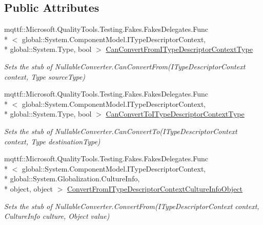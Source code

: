 \subsection*{Public Attributes}
\begin{DoxyCompactItemize}
\item 
mqttf\-::\-Microsoft.\-Quality\-Tools.\-Testing.\-Fakes.\-Fakes\-Delegates.\-Func\\*
$<$ global\-::\-System.\-Component\-Model.\-I\-Type\-Descriptor\-Context, \\*
global\-::\-System.\-Type, bool $>$ \hyperlink{class_system_1_1_component_model_1_1_fakes_1_1_stub_nullable_converter_ad3327aa95277d325a1bc1b96826f2998}{Can\-Convert\-From\-I\-Type\-Descriptor\-Context\-Type}
\begin{DoxyCompactList}\small\item\em Sets the stub of Nullable\-Converter.\-Can\-Convert\-From(\-I\-Type\-Descriptor\-Context context, Type source\-Type)\end{DoxyCompactList}\item 
mqttf\-::\-Microsoft.\-Quality\-Tools.\-Testing.\-Fakes.\-Fakes\-Delegates.\-Func\\*
$<$ global\-::\-System.\-Component\-Model.\-I\-Type\-Descriptor\-Context, \\*
global\-::\-System.\-Type, bool $>$ \hyperlink{class_system_1_1_component_model_1_1_fakes_1_1_stub_nullable_converter_a8e1501afc3f7a5d748d773dfed255031}{Can\-Convert\-To\-I\-Type\-Descriptor\-Context\-Type}
\begin{DoxyCompactList}\small\item\em Sets the stub of Nullable\-Converter.\-Can\-Convert\-To(\-I\-Type\-Descriptor\-Context context, Type destination\-Type)\end{DoxyCompactList}\item 
mqttf\-::\-Microsoft.\-Quality\-Tools.\-Testing.\-Fakes.\-Fakes\-Delegates.\-Func\\*
$<$ global\-::\-System.\-Component\-Model.\-I\-Type\-Descriptor\-Context, \\*
global\-::\-System.\-Globalization.\-Culture\-Info, \\*
object, object $>$ \hyperlink{class_system_1_1_component_model_1_1_fakes_1_1_stub_nullable_converter_ae6af5ee6434c7c4cc96bdafe570c8c47}{Convert\-From\-I\-Type\-Descriptor\-Context\-Culture\-Info\-Object}
\begin{DoxyCompactList}\small\item\em Sets the stub of Nullable\-Converter.\-Convert\-From(\-I\-Type\-Descriptor\-Context context, Culture\-Info culture, Object value)\end{DoxyCompactList}\item 

\end{DoxyCompactItemize}
